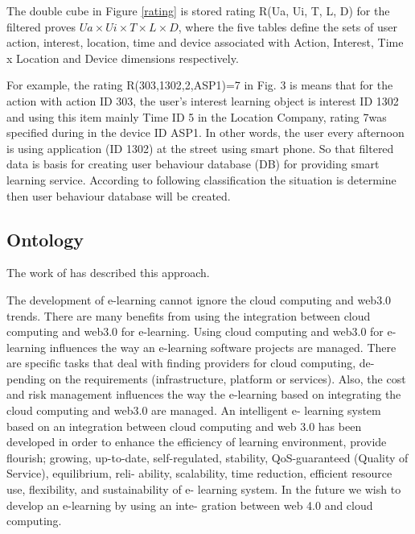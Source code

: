 \documentclass[journal]{vgtc}                %
\begin{document}
  The double cube in Figure \ref{rating} is stored rating R(Ua, Ui, T, L, D) for the filtered proves $Ua \times Ui \times T \times L \times D$, where the five tables define the sets of user action, interest, location, time and device associated with Action, Interest, Time x Location and Device dimensions respectively.

  For example, the rating R(303,1302,2,ASP1)=7 in Fig. 3 is means that for the action with action ID 303, the user's interest learning object is interest ID 1302 and using this item mainly Time ID 5 in the Location Company, rating 7was specified during in the device ID ASP1. In other words, the user every afternoon is using application (ID 1302) at the street using smart phone. So that filtered data is basis for creating user behaviour database (DB) for providing smart learning service. According to following classification the situation is determine then user behaviour database will be created.

  
  \subsection{Ontology}
  The work of \cite{nasr2012proposed} has described this approach.

  The development of e-learning cannot ignore the cloud computing and web3.0 trends. There are many benefits from using the integration between cloud computing and web3.0 for e-learning. Using cloud computing and web3.0 for e-learning influences the way an e-learning software projects are managed. There are specific tasks that deal with finding providers for cloud computing, de- pending on the requirements (infrastructure, platform or services). Also, the cost and risk management influences the way the e-learning based on integrating the cloud computing and web3.0 are managed. An intelligent e- learning system based on an integration between cloud computing and web 3.0 has been developed in order to enhance the efficiency of learning environment, provide flourish; growing, up-to-date, self-regulated, stability, QoS-guaranteed (Quality of Service), equilibrium, reli- ability, scalability, time reduction, efficient resource use, flexibility, and sustainability of e- learning system. In the future we wish to develop an e-learning by using an inte- gration between web 4.0 and cloud computing.
\end{document}
